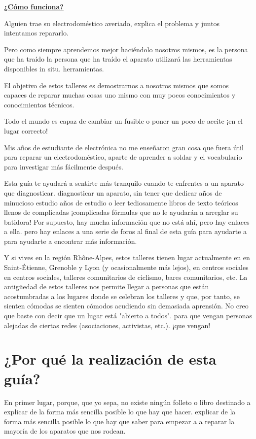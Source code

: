 \documentclass[a5paper,twoside,openany]{book}
\begin{document}
\textbf{\underline{¿Cómo funciona?}}

Alguien trae su electrodoméstico averiado, explica el problema y juntos intentamos repararlo.

Pero como siempre aprendemos mejor haciéndolo nosotros mismos, es la persona que ha traído
la persona que ha traído el aparato utilizará las herramientas disponibles in situ.
herramientas.

El objetivo de estos talleres es demostrarnos a nosotros mismos que somos capaces de
reparar muchas cosas uno mismo con muy pocos conocimientos y
conocimientos técnicos.

Todo el mundo es capaz de cambiar un fusible o poner un poco de aceite
¡en el lugar correcto!

Mis años de estudiante de electrónica no me enseñaron gran cosa que fuera útil para reparar un electrodoméstico, aparte de aprender a soldar y el vocabulario para investigar más fácilmente
después.

Esta guía te ayudará a sentirte más tranquilo cuando te enfrentes a un aparato que diagnosticar.
diagnosticar un aparato, sin tener que dedicar años de minucioso estudio
años de estudio o leer tediosamente libros de texto teóricos llenos de complicadas
¡complicadas fórmulas que no le ayudarán a arreglar su batidora!
Por supuesto, hay mucha información que no está ahí, pero hay enlaces a ella.
pero hay enlaces a una serie de foros al final de esta guía para ayudarte a
para ayudarte a encontrar más información.

Y si vives en la región Rhône-Alpes, estos talleres tienen lugar actualmente en
en Saint-Étienne, Grenoble y Lyon (y ocasionalmente más lejos), en centros sociales
en centros sociales, talleres comunitarios de ciclismo, bares comunitarios, etc.
La antigüedad de estos talleres nos permite llegar a personas que están
acostumbradas a los lugares donde se celebran los talleres y que, por tanto, se sienten cómodas
se sienten cómodos acudiendo sin demasiada aprensión.
No creo que baste con decir que un lugar está "abierto a todos".
para que vengan personas alejadas de ciertas redes (asociaciones, activistas, etc.).
¡que vengan!

\section{¿Por qué la realización de esta guía?}
En primer lugar, porque, que yo sepa, no existe ningún folleto o libro destinado a explicar de la forma más sencilla posible lo que hay que hacer.
explicar de la forma más sencilla posible lo que hay que saber para empezar a
a reparar la mayoría de los aparatos que nos rodean.
\end{document}

